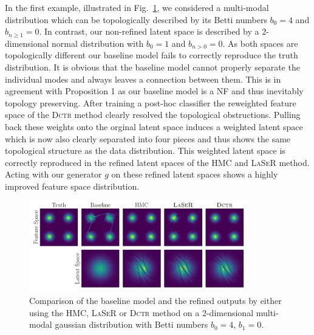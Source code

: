 In the first example, illustrated in Fig.~\ref{fig:gaussians}, we considered a multi-modal distribution which can be topologically described by its Betti numbers $b_0=4$ and $b_{n\ge1}=0$. In contrast, our non-refined latent space is described by a 2-dimensional normal distribution with $b_0=1$ and $b_{n>0}=0$. As both spaces are topologically different our baseline model fails to correctly reproduce the truth distribution. It is obvious that the baseline model cannot properly separate the individual modes and always leaves a connection between them. This is in agreement with Proposition 1 as our baseline model is a NF and thus inevitably topology preserving.
After training a post-hoc classifier the reweighted feature space of the \textsc{Dctr} method clearly resolved the topological obstructions. Pulling back these weights onto the orginal latent space induces a weighted latent space which is now also clearly separated into four pieces and thus shows the same topological structure as the data distribution. This weighted latent space is correctly reproduced in the refined latent spaces of the HMC and \textsc{LaSeR} method. Acting with our generator $g$ on these refined latent spaces shows a highly improved feature space distribution.
%
\begin{figure}[!htbp]
    \centering
    \includegraphics[width=0.85\textwidth]{./figures/LSR/4_gaussians.pdf}
  \caption{Comparison of the baseline model and the refined outputs by either using the HMC, \textsc{LaSeR} or \textsc{Dctr} method on a 2-dimensional multi-modal gaussian distribution with Betti numbers $b_0=4$, $b_1=0$.}
  \label{fig:gaussians}
\end{figure}
%

